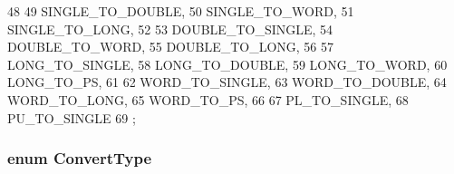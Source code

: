 \begin{DoxyCode}
48                 {
49     SINGLE_TO_DOUBLE,
50     SINGLE_TO_WORD,
51     SINGLE_TO_LONG,
52 
53     DOUBLE_TO_SINGLE,
54     DOUBLE_TO_WORD,
55     DOUBLE_TO_LONG,
56 
57     LONG_TO_SINGLE,
58     LONG_TO_DOUBLE,
59     LONG_TO_WORD,
60     LONG_TO_PS,
61 
62     WORD_TO_SINGLE,
63     WORD_TO_DOUBLE,
64     WORD_TO_LONG,
65     WORD_TO_PS,
66 
67     PL_TO_SINGLE,
68     PU_TO_SINGLE
69 };
\end{DoxyCode}
\hypertarget{namespaceMipsISA_a3eb2ef7126c12e67d97d307c7aaa381d}{
\subsubsection[{ConvertType}]{\setlength{\rightskip}{0pt plus 5cm}enum {\bf ConvertType}}}
\label{namespaceMipsISA_a3eb2ef7126c12e67d97d307c7aaa381d}
